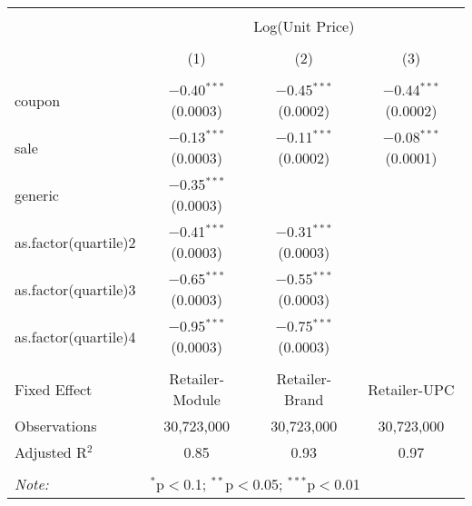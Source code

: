 
\begin{table}[!htbp] \centering 
  \caption{} 
  \label{tab:overallSavingsStorable} 
\begin{tabular}{@{\extracolsep{5pt}}lccc} 
\\[-1.8ex]\hline 
\hline \\[-1.8ex] 
 & \multicolumn{3}{c}{Log(Unit Price)} \\ 
\\[-1.8ex] & (1) & (2) & (3)\\ 
\hline \\[-1.8ex] 
 coupon & $-$0.40$^{***}$ (0.0003) & $-$0.45$^{***}$ (0.0002) & $-$0.44$^{***}$ (0.0002) \\ 
  sale & $-$0.13$^{***}$ (0.0003) & $-$0.11$^{***}$ (0.0002) & $-$0.08$^{***}$ (0.0001) \\ 
  generic & $-$0.35$^{***}$ (0.0003) &  &  \\ 
  as.factor(quartile)2 & $-$0.41$^{***}$ (0.0003) & $-$0.31$^{***}$ (0.0003) &  \\ 
  as.factor(quartile)3 & $-$0.65$^{***}$ (0.0003) & $-$0.55$^{***}$ (0.0003) &  \\ 
  as.factor(quartile)4 & $-$0.95$^{***}$ (0.0003) & $-$0.75$^{***}$ (0.0003) &  \\ 
 \hline \\[-1.8ex] 
Fixed Effect & Retailer-Module & Retailer-Brand & Retailer-UPC \\ 
Observations & 30,723,000 & 30,723,000 & 30,723,000 \\ 
Adjusted R$^{2}$ & 0.85 & 0.93 & 0.97 \\ 
\hline 
\hline \\[-1.8ex] 
\textit{Note:}  & \multicolumn{3}{l}{$^{*}$p$<$0.1; $^{**}$p$<$0.05; $^{***}$p$<$0.01} \\ 
\end{tabular} 
\end{table} 
